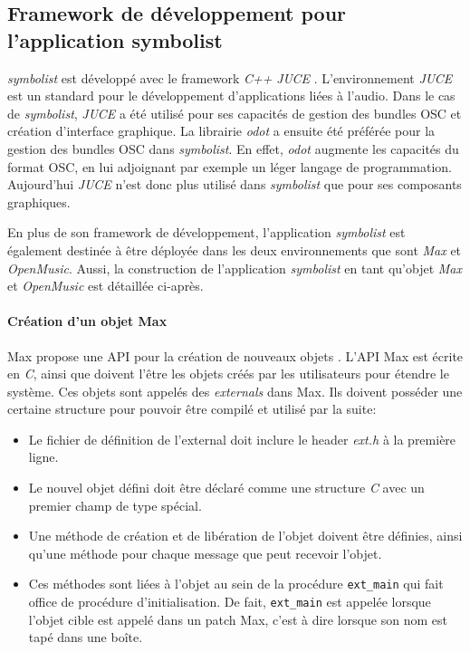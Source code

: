 \subsection{Framework de développement pour l'application symbolist}
\label{subsec:frameworkAndTechnologies}
\textit{symbolist} est développé avec le framework \textit{C++} \textit{JUCE} \cite{juce2018}. L'environnement \textit{JUCE} est un standard pour le développement d'applications liées à l'audio. Dans le cas de \textit{symbolist}, \textit{JUCE} a été utilisé pour ses capacités de gestion des bundles OSC et création d'interface graphique. La librairie \textit{odot} a ensuite été préférée pour la gestion des bundles OSC dans \textit{symbolist}. En effet, \textit{odot} augmente les capacités du format OSC, en lui adjoignant par exemple un léger langage de programmation. Aujourd'hui \textit{JUCE} n'est donc plus utilisé dans \textit{symbolist} que pour ses composants graphiques. 

En plus de son framework de développement, l'application \textit{symbolist} est également destinée à être déployée dans les deux environnements que sont \textit{Max} et \textit{OpenMusic}. Aussi, la construction de l'application \textit{symbolist} en tant qu'objet \textit{Max} et \textit{OpenMusic} est détaillée ci-après.

\paragraph{Création d'un objet Max} Max propose une API pour la création de nouveaux objets \cite{maxApi2018}. L'API Max est écrite en \textit{C}, ainsi que doivent l'être les objets créés par les utilisateurs pour étendre le système.
Ces objets sont appelés des \textit{externals} dans Max.
Ils doivent posséder une certaine structure pour pouvoir être compilé et utilisé par la suite:
\begin{itemize}[label=--]
	\item Le fichier de définition de l'external doit inclure le header \textit{ext.h} à la première ligne.
	\item Le nouvel objet défini doit être déclaré comme une structure \textit{C} avec un premier champ de type spécial.
	\item Une méthode de création et de libération de l'objet doivent être définies, ainsi qu'une méthode pour chaque message que peut recevoir l'objet.
	\item Ces méthodes sont liées à l'objet au sein de la procédure \lstinline|ext_main| qui fait office de procédure d'initialisation. De fait, \lstinline|ext_main| est appelée lorsque l'objet cible est appelé dans un patch Max, c'est à dire lorsque son nom est tapé dans une boîte.
\end{itemize}

